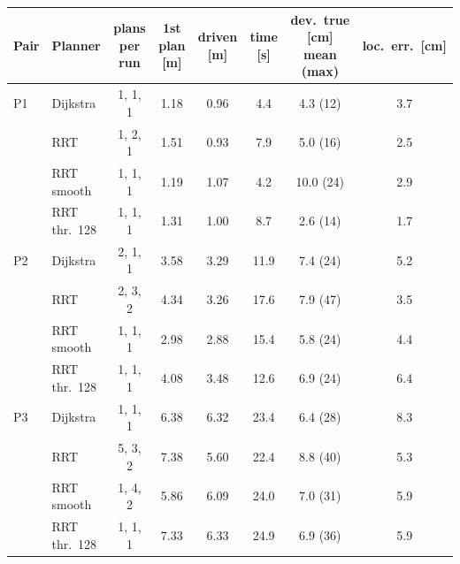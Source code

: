 \documentclass[10pt]{article}
\begin{document}
\begin{tabular}{llcccccc}
\toprule
Pair & Planner & plans per run & 1st plan [m] & driven [m] & time [s] & dev.\ true [cm] mean (max) & loc.\ err.\ [cm] \\
\midrule
P1 & Dijkstra      & 1, 1, 1 & 1.18 & 0.96 & 4.4  & 4.3 (12)  & 3.7 \\
   & RRT           & 1, 2, 1 & 1.51 & 0.93 & 7.9  & 5.0 (16)  & 2.5 \\
   & RRT smooth    & 1, 1, 1 & 1.19 & 1.07 & 4.2  & 10.0 (24) & 2.9 \\
   & RRT thr.\ 128 & 1, 1, 1 & 1.31 & 1.00 & 8.7  & 2.6 (14)  & 1.7 \\
P2 & Dijkstra      & 2, 1, 1 & 3.58 & 3.29 & 11.9 & 7.4 (24)  & 5.2 \\
   & RRT           & 2, 3, 2 & 4.34 & 3.26 & 17.6 & 7.9 (47)  & 3.5 \\
   & RRT smooth    & 1, 1, 1 & 2.98 & 2.88 & 15.4 & 5.8 (24)  & 4.4 \\
   & RRT thr.\ 128 & 1, 1, 1 & 4.08 & 3.48 & 12.6 & 6.9 (24)  & 6.4 \\
P3 & Dijkstra      & 1, 1, 1 & 6.38 & 6.32 & 23.4 & 6.4 (28)  & 8.3 \\
   & RRT           & 5, 3, 2 & 7.38 & 5.60 & 22.4 & 8.8 (40)  & 5.3 \\
   & RRT smooth    & 1, 4, 2 & 5.86 & 6.09 & 24.0 & 7.0 (31)  & 5.9 \\
   & RRT thr.\ 128 & 1, 1, 1 & 7.33 & 6.33 & 24.9 & 6.9 (36)  & 5.9 \\
\bottomrule
\end{tabular}
\end{document}
